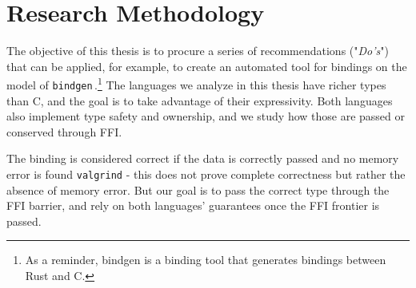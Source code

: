 \documentclass[nomenclature, english, bibtex]{kththesis}
\newcommand*{\generalExpl}[1]{\todo[inline]{#1}}
\newcommand*{\sweExpl}[1]{\todo[inline, backgroundcolor=kth-lightblue40]{#1}}  %
\begin{document}
\section{Research Methodology}
The objective of this thesis is to procure a series of recommendations ("\textit{Do's}") that can be applied, for example, to create an automated tool for bindings on the model of \texttt{bindgen}\,\cite{noauthor_bindgen_2022}.\footnote{As a reminder, bindgen is a binding tool that generates bindings between Rust and C.} 
The languages we analyze in this thesis have richer types than C, and the goal is to take advantage of their expressivity. Both languages also implement type safety and ownership, and we study how those are passed or conserved through \gls{FFI}.

The binding is considered correct if the data is correctly passed and no memory error is found \texttt{valgrind} - this does not prove complete correctness but rather the absence of memory error. But our goal is to pass the correct type through the \gls{FFI} barrier, and rely on both languages' guarantees once the \gls{FFI} frontier is passed. 
\end{document}
